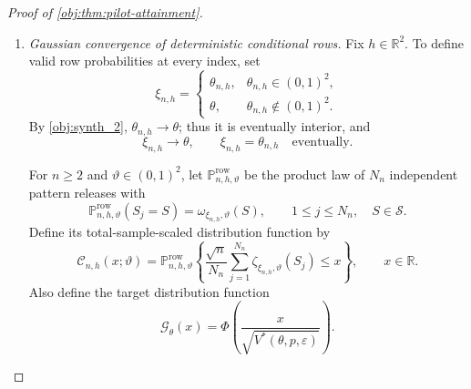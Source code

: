 \documentclass[11pt]{article}
\begin{document}
\begin{proof}[Proof of \cref{obj:thm:pilot-attainment}]
\begin{enumerate}
To establish continuity of the optimized value, define
\[
K=[-\overline t,\overline t],
\qquad
\mathcal E_\xi(u)=\max_{\alpha\in\mathcal A_\varepsilon}
F_\xi(\alpha,u),
\quad \xi\in(0,1)^2,\ u\in\mathbb R.
\]
The saddle inequalities give
\[
\mathcal E_\xi(t_\xi)=J_\xi,
\qquad
\mathcal E_\xi(u)\ge
F_\xi(\alpha_\xi,u)\ge J_\xi.
\]
Since \(t_\xi\in K\),
\[
J^*(\xi,p,\varepsilon)=\min_{u\in K}\mathcal E_\xi(u).
\]
The feasible set is nonempty, closed, and contained in \([0,1]^{14}\), hence compact. The objective is jointly continuous on interior parameters, feasible weights, and \(K\). The elementary bounds for maxima and minima give
\[
\left|J^*(\xi,p,\varepsilon)-J^*(\theta,p,\varepsilon)\right|
\le
\sup_{\substack{\alpha\in\mathcal A_\varepsilon\\u\in K}}
|F_\xi(\alpha,u)-F_\theta(\alpha,u)|
\longrightarrow0
\quad(\xi\to\theta).
\]
The convergence follows from joint continuity on a compact parameter neighborhood times \(\mathcal A_\varepsilon\times K\). Positivity of \(J^*\) then gives
\[
V^*(\xi,p,\varepsilon)\longrightarrow V^*(\theta,p,\varepsilon).
\]
Combining this with the displayed variance-error bound proves
\[
\sigma^2(\xi,\vartheta)\longrightarrow V^*(\theta,p,\varepsilon)
\qquad
\text{as }(\xi,\vartheta)\to(\theta,\theta)
\text{ through interior pairs}.
\]

\item \emph{Gaussian convergence of deterministic conditional rows.}
Fix \(h\in\mathbb R^2\). To define valid row probabilities at every index, set
\[
\xi_{n,h}=
\begin{cases}
\theta_{n,h},&\theta_{n,h}\in(0,1)^2,\\
\theta,&\theta_{n,h}\notin(0,1)^2.
\end{cases}
\]
By \cref{obj:synth_2}, \(\theta_{n,h}\to\theta\); thus it is eventually interior, and
\[
\xi_{n,h}\to\theta,
\qquad
\xi_{n,h}=\theta_{n,h}\quad\text{eventually}.
\]

For \(n\ge2\) and \(\vartheta\in(0,1)^2\), let
\(\mathbb P^{\mathrm{row}}_{n,h,\vartheta}\) be the product law of \(N_n\) independent pattern releases with
\[
\mathbb P^{\mathrm{row}}_{n,h,\vartheta}(S_j=S)
=\omega_{\xi_{n,h},\vartheta}(S),
\qquad 1\le j\le N_n,\quad S\in\mathcal S.
\]
Define its total-sample-scaled distribution function by
\[
\mathcal C_{n,h}(x;\vartheta)
=
\mathbb P^{\mathrm{row}}_{n,h,\vartheta}
\left\{
\frac{\sqrt n}{N_n}
\sum_{j=1}^{N_n}\zeta_{\xi_{n,h},\vartheta}(S_j)\le x
\right\},
\qquad x\in\mathbb R.
\]
Also define the target distribution function
\[
\mathcal G_\theta(x)
=\Phi\left(\frac{x}{\sqrt{V^*(\theta,p,\varepsilon)}}\right).
\]


\end{enumerate}
\end{proof}
\end{document}
